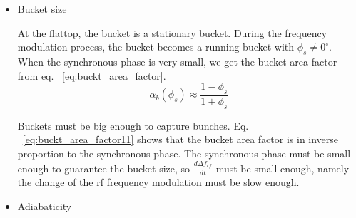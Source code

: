 \begin{itemize}
%
%




\item Bucket size

At the flattop, the bucket is a stationary bucket. During the frequency modulation process, the bucket becomes a running bucket with $\phi_{s}\neq 0^\circ$. When the synchronous phase is very small, we get the bucket area factor from eq. ~\ref{eq:buckt_area_factor}. 
\begin{equation} 
\alpha_b(\phi_{s})\approx \frac{1-\phi_{s}}{1+\phi_{s}}
\label{eq:buckt_area_factor11}
\end{equation} 

Buckets must be big enough to capture bunches. Eq. ~\ref{eq:buckt_area_factor11} shows that the bucket area factor is in inverse proportion to the synchronous phase. The synchronous phase must be small enough to guarantee the bucket size, so $\frac{d\Delta f_{\mathit{rf}}}{dt}$ must be small enough, namely the change of the rf frequency modulation must be slow enough.

\item Adiabaticity 



\end{itemize}
